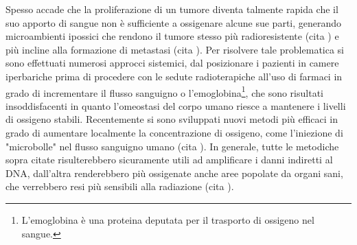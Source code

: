 \documentclass[12pt,a4paper,twoside]{report}
\begin{document}
	 Spesso accade che la proliferazione di un tumore diventa talmente rapida che il suo apporto di sangue non è sufficiente a ossigenare alcune sue parti, generando microambienti ipossici che rendono il tumore stesso più radioresistente (cita
	 ) e più incline alla formazione di metastasi (cita
	 ). Per risolvere tale problematica si sono effettuati numerosi approcci sistemici, dal posizionare i pazienti in camere iperbariche prima di procedere con le sedute radioterapiche all'uso di farmaci in grado di incrementare il flusso sanguigno o l'emoglobina\footnote{L'emoglobina è una proteina deputata per il trasporto di ossigeno nel sangue.}, che sono risultati insoddisfacenti in quanto l'omeostasi del corpo umano riesce a mantenere i livelli di ossigeno stabili. Recentemente si sono sviluppati nuovi metodi più efficaci in grado di aumentare localmente la concentrazione di ossigeno, come l'iniezione di "microbolle" nel flusso sanguigno umano (cita
	 ). In generale, tutte le metodiche sopra citate risulterebbero sicuramente utili ad amplificare i danni indiretti al DNA, dall'altra renderebbero più ossigenate anche aree popolate da organi sani, che verrebbero resi più sensibili alla radiazione (cita
	 ).
	
\end{document}
